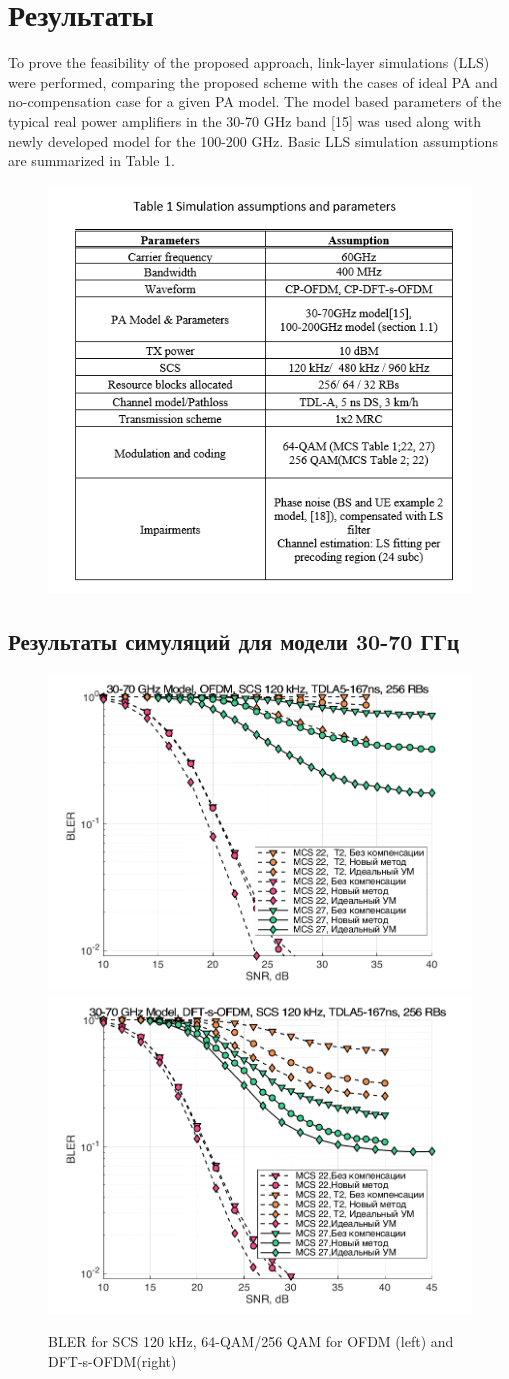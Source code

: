 \section{Результаты}
To prove the feasibility of the proposed approach, link-layer simulations
(LLS) were performed, comparing the proposed scheme with the cases of ideal
PA and no-compensation case for a given PA model. The model based
parameters of the typical real power amplifiers in the 30-70 GHz band [15]
was used along with newly developed model for the 100-200 GHz. Basic LLS
simulation assumptions are summarized in Table 1.

\begin{figure}[h!]
    \centering
    \includegraphics[width=0.5\linewidth]{figs/parameters table.png}
\end{figure}

\subsection{Результаты симуляций для модели 30-70 ГГц}

\begin{figure}[h!]
    \centering
    \includegraphics[width=0.49\linewidth]{figs/res/ofdm/OFDM_Nokia_SCS120_MCS22_27.png}
    \includegraphics[width=0.49\linewidth]{figs/res/dftsofdm/DFT-s-OFDM_Nokia_SCS120_MCS22_27.png}
    \caption{BLER for SCS 120 kHz, 64-QAM/256 QAM for OFDM (left) and DFT-s-OFDM(right)}
    \label{fig:res3070_scs120}
\end{figure}

